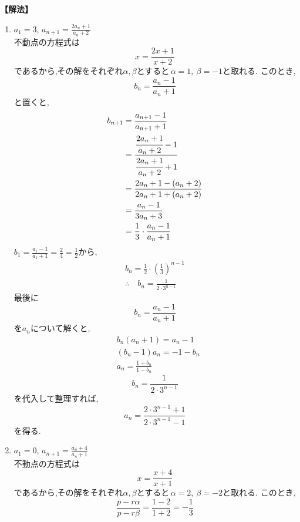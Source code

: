     \noindent\textbf{【解法】}
    \begin{enumerate}[label=(\arabic*),parsep=3pt]
      \item $\displaystyle a_1=3,\, a_{n+1}=\frac{2a_n+1}{a_n+2}$\\
            不動点の方程式は
            \[
              x=\frac{2x+1}{x+2}
            \]
            であるから,その解をそれぞれ$\alpha,\beta$とすると\,$\alpha=1,\ \beta=-1$と取れる.
            このとき,
            \[
              b_n=\frac{a_n-1}{a_n+1}
            \]
            と置くと,
            \begin{align*}
              b_{n+1}&=\frac{a_{n+1}-1}{a_{n+1}+1}\\
              &=\cfrac{\cfrac{2a_n+1}{a_n+2}-1}{\cfrac{2a_n+1}{a_n+2}+1}\\
              &=\frac{2a_n+1-(a_n+2)}{2a_n+1+(a_n+2)}\\
              &=\frac{a_n-1}{3a_n+3}\\
              &=\frac{1}{3}\cdot \frac{a_n-1}{a_n+1}
            \end{align*}
            $\displaystyle b_1=\frac{a_1-1}{a_1+1}=\frac{2}{4}=\frac{1}{2}$から,
            \begin{align*}
              b_{n}=\frac{1}{2}\cdot\left(\frac{1}{3}\right)^{n-1}\\
              \therefore \quad b_n=\frac{1}{2\cdot3^{n-1}}
            \end{align*}
            最後に
            \[
              b_n=\frac{a_n-1}{a_n+1}
            \]
            を$a_n$について解くと,
            \begin{align*}
              &b_n(a_n+1)=a_n-1\\
              &(b_n-1)a_n=-1-b_n\\
              &a_n=\frac{1+b_n}{1-b_n}
            \end{align*}
            \[
              b_n=\frac{1}{2\cdot3^{n-1}}
            \]
            を代入して整理すれば,
            \[
              a_n=\frac{2\cdot3^{n-1}+1}{2\cdot3^{n-1}-1}
            \]
            を得る.
      \item $\displaystyle a_1=0,\, a_{n+1}=\frac{a_n+4}{a_n+1}$\\
            不動点の方程式は
            \[
              x=\frac{x+4}{x+1}
            \]
            であるから,その解をそれぞれ$\alpha,\beta$とすると\,$\alpha=2,\ \beta=-2$と取れる.
            このとき,
            \[
              \frac{p-r\alpha}{p-r\beta}=\frac{1-2}{1+2}=-\frac13
\]
\end{enumerate}
